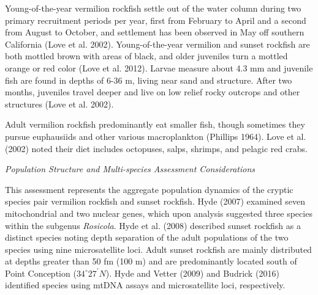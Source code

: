 \documentclass[11pt,
  english,
]{article}
\begin{document}
Young-of-the-year vermilion rockfish settle out of the water column during two primary recruitment periods per year, first from February to April and a second from August to October, and settlement has been observed in May off southern California {(Love et al. 2002)\leavevmode\tagmcend\tagstructend}. Young-of-the-year vermilion and sunset rockfish are both mottled brown with areas of black, and older juveniles turn a mottled orange or red color {(Love et al. 2012)\leavevmode\tagmcend\tagstructend}. Larvae measure about 4.3 mm and juvenile fish are found in depths of 6-36 m, living near sand and structure. After two months, juveniles travel deeper and live on low relief rocky outcrops and other structures {(Love et al. 2002)\leavevmode\tagmcend\tagstructend}.

Adult vermilion rockfish predominantly eat smaller fish, though sometimes they pursue euphausiids and other various macroplankton {(Phillips 1964)\leavevmode\tagmcend\tagstructend}. Love et al. {(2002)\leavevmode\tagmcend\tagstructend} noted their diet includes octopuses, salps, shrimps, and pelagic red crabs.

\emph{Population Structure and Multi-species Assessment Considerations}

This assessment represents the aggregate population dynamics of the cryptic species pair vermilion rockfish and sunset rockfish. Hyde {(2007)\leavevmode\tagmcend\tagstructend} examined seven mitochondrial and two nuclear genes, which upon analysis suggested three species within the subgenus \emph{Rosicola}. Hyde et al. {(2008)\leavevmode\tagmcend\tagstructend} described sunset rockfish as a distinct species noting depth separation of the adult populations of the two species using nine microsatellite loci. Adult sunset rockfish are mainly distributed at depths greater than 50 fm (100 m) and are predominantly located south of Point Conception ($34^\circ 27^\prime N$). Hyde and Vetter {(2009)\leavevmode\tagmcend\tagstructend} and Budrick {(2016)\leavevmode\tagmcend\tagstructend} identified species using mtDNA assays and microsatellite loci, respectively.
\end{document}
